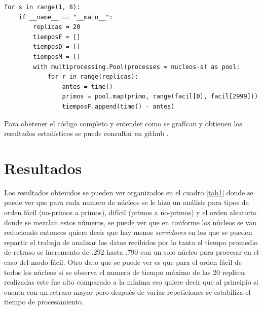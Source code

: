 \documentclass[a4paper, 11pt]{article}
\begin{document}
\begin{verbatim}
for s in range(1, 8):
    if __name__ == "__main__":
        replicas = 20
        tiemposF = []
        tiemposD = []
        tiemposM = []
        with multiprocessing.Pool(processes = nucleos-s) as pool:
            for r in range(replicas): 
                antes = time()
                primos = pool.map(primo, range(facil[0], facil[2999]))
                tiemposF.append(time() - antes)  
\end{verbatim}
Para obetener el código completo y entender como se grafícan y obtienen los resultados estadísticos se puede consultar en github \cite{Edson}.


\section{Resultados}
Los resultados obtenidos se pueden ver organizados en el cuadro \ref{tab1} donde se puede ver que para cada numero de núcleos se le hizo un análisis para tipos de orden fácil (no-primos a primos), difícil (primos a no-primos) y el orden aleatorio donde se mezclan estos números, se puede ver que en conforme los núcleos se van reduciendo entonces quiere decir que hay menos \textit{servidores} en los que se pueden repartir el trabajo de analizar los datos recibidos por lo tanto el tiempo promedio de retraso se incremento de .292 hasta .790 con un solo núcleo para procesar en el caso del modo fácil. Otro dato que se puede ver es que para el orden fácil de todos los núcleos si se observa el numero de tiempo máximo de las 20 replicas realizadas este fue alto comparado a la mínima eso quiere decir que al principio si cuenta con un retraso mayor pero después de varias repeticiones se estabiliza el tiempo de procesamiento.
\end{document}
